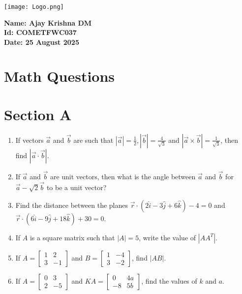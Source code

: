 \documentclass[12pt]{article}
\begin{document}
\begin{minipage}{0.45\textwidth}
  \texttt{[image: Logo.png]}
\end{minipage}
\hfill
\begin{minipage}{0.45\textwidth}
  \raggedleft
  \textbf{Name: Ajay Krishna DM}\\
  \textbf{Id: COMETFWC037}\\
  \textbf{Date: 25 August 2025}\\
\end{minipage}

\section*{Math Questions}

\section*{Section A}

\begin{enumerate}
    \item If vectors $\vec{a}$ and $\vec{b}$ are such that $|\vec{a}|=\tfrac{1}{2}, |\vec{b}|=\tfrac{4}{\sqrt{3}}$ and $|\vec{a}\times \vec{b}|=\tfrac{1}{\sqrt{3}}$, then find $|\vec{a}\cdot \vec{b}|$.

    \item If $\vec{a}$ and $\vec{b}$ are unit vectors, then what is the angle between $\vec{a}$ and $\vec{b}$ for $\vec{a}-\sqrt{2}\vec{b}$ to be a unit vector?

    \item Find the distance between the planes $\vec{r}\cdot(2\hat{i}-3\hat{j}+6\hat{k})-4=0$ and $\vec{r}\cdot(6\hat{i}-9\hat{j}+18\hat{k})+30=0$.

    \item If $A$ is a square matrix such that $|A|=5$, write the value of $|AA^T|$.

    \item If $A=\begin{bmatrix}1 & 2 \\ 3 & -1\end{bmatrix}$ and $B=\begin{bmatrix}1 & -4 \\ 3 & -2\end{bmatrix}$, find $|AB|$.

    \item If $A=\begin{bmatrix}0 & 3 \\ 2 & -5\end{bmatrix}$ and $KA=\begin{bmatrix}0 & 4a \\ -8 & 5b\end{bmatrix}$, find the values of $k$ and $a$.
\end{enumerate}
\end{document}
